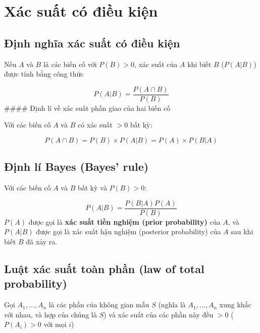 \documentclass[
]{book}
\begin{document}
\hypertarget{xuxe1c-suux1ea5t-cuxf3-ux111iux1ec1u-kiux1ec7n}{%
\section{Xác suất có điều kiện}\label{xuxe1c-suux1ea5t-cuxf3-ux111iux1ec1u-kiux1ec7n}}

\hypertarget{ux111ux1ecbnh-nghux129a-xuxe1c-suux1ea5t-cuxf3-ux111iux1ec1u-kiux1ec7n}{%
\subsection{Định nghĩa xác suất có điều kiện}\label{ux111ux1ecbnh-nghux129a-xuxe1c-suux1ea5t-cuxf3-ux111iux1ec1u-kiux1ec7n}}

Nếu \(A\) và \(B\) là các biến cố với \(P(B) > 0\), xác suất của \(A\) khi biết \(B\) (\(P(A | B)\)) được tính bằng công thức

\[
P(A|B) = \frac{P(A \cap B)}{P(B)}
\]
\#\#\#\# Định lí về xác suất phần giao của hai biến cố

Với các biến cố \(A\) và \(B\) có xác suất \(>0\) bất kỳ:

\[
P(A \cap B) = P(B) \times P(A|B) = P(A) \times P(B|A)
\]

\hypertarget{ux111ux1ecbnh-luxed-bayes-bayes-rule}{%
\subsection{Định lí Bayes (Bayes' rule)}\label{ux111ux1ecbnh-luxed-bayes-bayes-rule}}

Với các biến cố \(A\) và \(B\) bất kỳ và \(P(B) > 0\):

\[
P(A|B) = \frac{P(B|A)P(A)}{P(B)}
\]
\(P(A)\) được gọi là \textbf{xác suất tiền nghiệm (prior probability)} của \(A\), và \(P(A|B)\) được gọi là xác suất hậu nghiệm (posterior probability) của \(A\) sau khi biết \(B\) đã xảy ra.

\hypertarget{luux1eadt-xuxe1c-suux1ea5t-touxe0n-phux1ea7n-law-of-total-probability}{%
\subsection{Luật xác suất toàn phần (law of total probability)}\label{luux1eadt-xuxe1c-suux1ea5t-touxe0n-phux1ea7n-law-of-total-probability}}

Gọi \(A_1,\ldots,A_n\) là các phần của không gian mẫu \(S\) (nghĩa là \(A_1,\ldots,A_n\) xung khắc với nhau, và hợp của chúng là \(S\)) và xác suất của các phần này đều \(>0\) (\(P(A_i) > 0\) với mọi \(i\))
\end{document}

